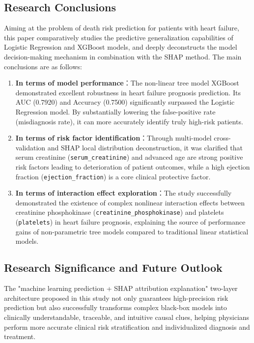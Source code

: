 \documentclass[11pt,a4paper]{article}
\begin{document}
\subsection{Research Conclusions}
Aiming at the problem of death risk prediction for patients with heart failure, this paper comparatively studies the predictive generalization capabilities of Logistic Regression and XGBoost models, and deeply deconstructs the model decision-making mechanism in combination with the SHAP method. The main conclusions are as follows:
\begin{sloppypar}
\begin{enumerate}
    \item \textbf{In terms of model performance}：The non-linear tree model XGBoost demonstrated excellent robustness in heart failure prognosis prediction. Its AUC (0.7920) and Accuracy (0.7500) significantly surpassed the Logistic Regression model. By substantially lowering the false-positive rate (misdiagnosis rate), it can more accurately identify truly high-risk patients.
    \item \textbf{In terms of risk factor identification}：Through multi-model cross-validation and SHAP local distribution deconstruction, it was clarified that serum creatinine (\texttt{serum\_creatinine}) and advanced age are strong positive risk factors leading to deterioration of patient outcomes, while a high ejection fraction (\texttt{ejection\_fraction}) is a core clinical protective factor.
    \item \textbf{In terms of interaction effect exploration}：The study successfully demonstrated the existence of complex nonlinear interaction effects between creatinine phosphokinase (\texttt{creatinine\_phosphokinase}) and platelets (\texttt{platelets}) in heart failure prognosis, explaining the source of performance gains of non-parametric tree models compared to traditional linear statistical models.
\end{enumerate}
\end{sloppypar}

\subsection{Research Significance and Future Outlook}
The "machine learning prediction + SHAP attribution explanation" two-layer architecture proposed in this study not only guarantees high-precision risk prediction but also successfully transforms complex black-box models into clinically understandable, traceable, and intuitive causal clues, helping physicians perform more accurate clinical risk stratification and individualized diagnosis and treatment.
\end{document}
